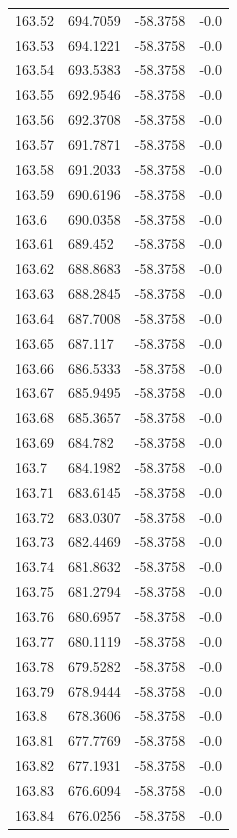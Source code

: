 \begin{table}[H]
\begin{tabular}{llll}
163.52 & 694.7059 & -58.3758 & -0.0 \\
163.53 & 694.1221 & -58.3758 & -0.0 \\
163.54 & 693.5383 & -58.3758 & -0.0 \\
163.55 & 692.9546 & -58.3758 & -0.0 \\
163.56 & 692.3708 & -58.3758 & -0.0 \\
163.57 & 691.7871 & -58.3758 & -0.0 \\
163.58 & 691.2033 & -58.3758 & -0.0 \\
163.59 & 690.6196 & -58.3758 & -0.0 \\
163.6 & 690.0358 & -58.3758 & -0.0 \\
163.61 & 689.452 & -58.3758 & -0.0 \\
163.62 & 688.8683 & -58.3758 & -0.0 \\
163.63 & 688.2845 & -58.3758 & -0.0 \\
163.64 & 687.7008 & -58.3758 & -0.0 \\
163.65 & 687.117 & -58.3758 & -0.0 \\
163.66 & 686.5333 & -58.3758 & -0.0 \\
163.67 & 685.9495 & -58.3758 & -0.0 \\
163.68 & 685.3657 & -58.3758 & -0.0 \\
163.69 & 684.782 & -58.3758 & -0.0 \\
163.7 & 684.1982 & -58.3758 & -0.0 \\
163.71 & 683.6145 & -58.3758 & -0.0 \\
163.72 & 683.0307 & -58.3758 & -0.0 \\
163.73 & 682.4469 & -58.3758 & -0.0 \\
163.74 & 681.8632 & -58.3758 & -0.0 \\
163.75 & 681.2794 & -58.3758 & -0.0 \\
163.76 & 680.6957 & -58.3758 & -0.0 \\
163.77 & 680.1119 & -58.3758 & -0.0 \\
163.78 & 679.5282 & -58.3758 & -0.0 \\
163.79 & 678.9444 & -58.3758 & -0.0 \\
163.8 & 678.3606 & -58.3758 & -0.0 \\
163.81 & 677.7769 & -58.3758 & -0.0 \\
163.82 & 677.1931 & -58.3758 & -0.0 \\
163.83 & 676.6094 & -58.3758 & -0.0 \\
163.84 & 676.0256 & -58.3758 & -0.0 \\

\end{tabular}
\end{table}
